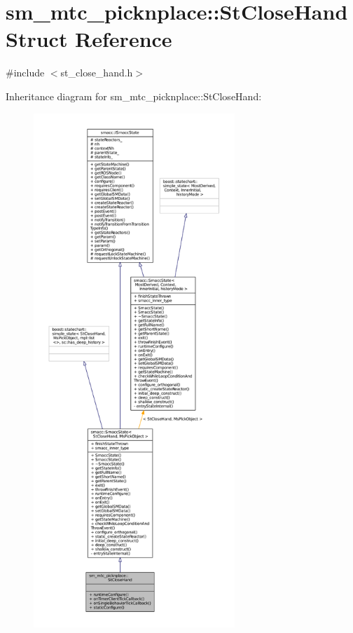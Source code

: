 \hypertarget{structsm__mtc__picknplace_1_1StCloseHand}{}\section{sm\+\_\+mtc\+\_\+picknplace\+:\+:St\+Close\+Hand Struct Reference}
\label{structsm__mtc__picknplace_1_1StCloseHand}


{\ttfamily \#include $<$st\+\_\+close\+\_\+hand.\+h$>$}



Inheritance diagram for sm\+\_\+mtc\+\_\+picknplace\+:\+:St\+Close\+Hand\+:
\nopagebreak
\begin{figure}[H]
\begin{center}
\leavevmode
\includegraphics[height=550pt]{structsm__mtc__picknplace_1_1StCloseHand__inherit__graph}
\end{center}
\end{figure}


